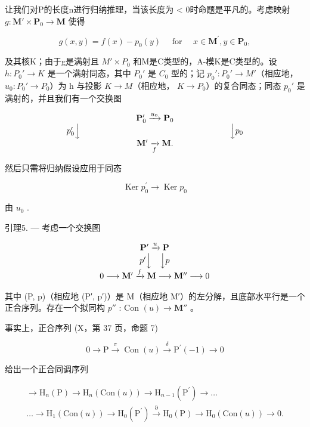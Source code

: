 让我们对P的长度n进行归纳推理，当该长度为 \textless{} 0时命题是平凡的。考虑映射 \(g: \mathbf{M}' \times \mathbf{P}_0 \to \mathbf{M}\) 使得

\[
g (x, y) = f (x) - p _ {0} (y) \quad \text { for } \quad x \in \mathbf {M} ^ {\prime}, y \in \mathbf {P} _ {0},
\]

及其核K；由于g是满射且 \(M' \times P_{0}\) 和M是C类型的，A-模K是C类型的。设 \(h : P_{0}' \to K\) 是一个满射同态，其中 \(P_{0}'\) 是 \(C_{0}\) 型的；记 \(p_{0}' : P_{0}' \to M'\)（相应地， \(u_{0} : P_{0}' \to P_{0}\)）为 h 与投影 \(K \to M\)（相应地， \(K \to P_{0}\)）的复合同态；同态 \(p_{0}'\) 是满射的，并且我们有一个交换图

\[
\begin{array}{c} \mathbf {P} _ {0} ^ {\prime} \xrightarrow {u _ {0}} \mathbf {P} _ {0} \\ p _ {0} ^ {\prime} \Big \downarrow \qquad \qquad \qquad \qquad \qquad \qquad \qquad \qquad \qquad \Big \downarrow p _ {0} \\ \mathbf {M} ^ {\prime} \xrightarrow [ f ]{} \mathbf {M}. \end{array}
\]

然后只需将归纳假设应用于同态

\[
\operatorname{Ker} p _ {0} ^ {\prime} \rightarrow \operatorname{Ker} p _ {0}
\]

由 \(u_{0}\) .

引理5. --- 考虑一个交换图

\[
\begin{array}{c} \mathbf {P} ^ {\prime} \xrightarrow {u} \mathbf {P} \\ p ^ {\prime} \Big \downarrow \quad \Big \downarrow p \\ 0 \longrightarrow \mathbf {M} ^ {\prime} \xrightarrow {f} \mathbf {M} \longrightarrow \mathbf {M} ^ {\prime \prime} \longrightarrow 0 \end{array}
\]

其中 (P, p)（相应地 (P′, p′)）是 M（相应地 M′）的左分解，且底部水平行是一个正合序列。存在一个拟同构 \(p''\) : Con \((u) \to \mathbf{M}''\) 。

事实上，正合序列 (X，第 37 页，命题 7)

\[
0 \to \mathrm{P} \xrightarrow {\pi} \operatorname{Con} (u) \xrightarrow {\delta} \mathrm{P} ^ {\prime} (- 1) \to 0
\]

给出一个正合同调序列

\[
\begin{array}{c}\rightarrow \mathrm{H} _ {n} (\mathrm{P}) \rightarrow \mathrm{H} _ {n} (\mathrm{Con} (u)) \rightarrow \mathrm{H} _ {n - 1} (\mathrm{P} ^ {\prime}) \rightarrow \dots\\\dots \rightarrow \mathrm{H} _ {1} (\mathrm{Con} (u)) \rightarrow \mathrm{H} _ {0} (\mathrm{P} ^ {\prime}) \stackrel {{\partial}} {{\rightarrow}} \mathrm{H} _ {0} (\mathrm{P}) \rightarrow \mathrm{H} _ {0} (\mathrm{Con} (u)) \rightarrow 0.\end{array}
\]

